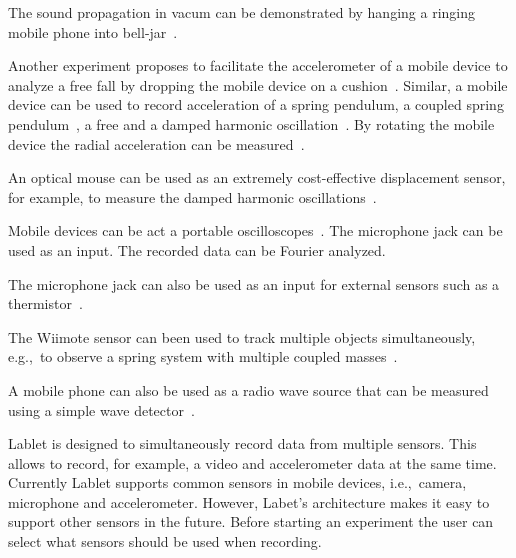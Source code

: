 \documentclass{sigchi}
\newcommand{\eg}{e.g.,\ }
\newcommand{\ie}{i.e.,\ }
\begin{document}
The sound propagation in vacum can be demonstrated by hanging a ringing mobile phone into bell-jar~\cite{CaleonBellJar2013}.



Another experiment proposes to facilitate the accelerometer of a mobile device to analyze a free fall by dropping the mobile device on a cushion~\cite{VogtFreeFall2012}.
Similar, a mobile device can be used to record acceleration of a spring pendulum, a coupled spring pendulum~\cite{KuhnPendulum2012}, a free and a damped harmonic oscillation~\cite{Castro2013}.
By rotating the mobile device the radial acceleration can be measured~\cite{VogtRadialAcc2013}.



An optical mouse can be used as an extremely cost-effective displacement sensor, for example, to measure the damped harmonic oscillations~\cite{Ng2005}.

Mobile devices can be act a portable oscilloscopes~\cite{Forinash2012}.
The microphone jack can be used as an input.
The recorded data can be Fourier analyzed.

The microphone jack can also be used as an input for external sensors such as a thermistor~\cite{Forinash2012}.

The Wiimote sensor can been used to track multiple objects simultaneously, \eg to observe a spring system with multiple coupled masses~\cite{Skeffington2012}.

A mobile phone can also be used as a radio wave source that can be measured using a simple wave detector~\cite{Hare2010}.


Lablet is designed to simultaneously record data from multiple sensors.
This allows to record, for example, a video and accelerometer data at the same time.
Currently Lablet supports common sensors in mobile devices, \ie camera, microphone and accelerometer.
However, Labet's architecture makes it easy to support other sensors in the future.
Before starting an experiment the user can select what sensors should be used when recording.
\end{document}

